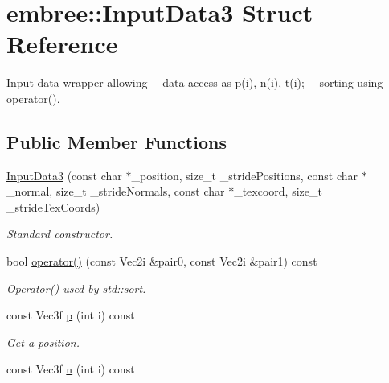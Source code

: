 \hypertarget{structembree_1_1_input_data3}{
\section{embree::InputData3 Struct Reference}
\label{structembree_1_1_input_data3}
}


Input data wrapper allowing -\/-\/ data access as p(i), n(i), t(i); -\/-\/ sorting using operator().  


\subsection*{Public Member Functions}
\begin{DoxyCompactItemize}
\item 
\hypertarget{structembree_1_1_input_data3_a89c0df89ad67e3b77adde63059ed0fe5}{
\hyperlink{structembree_1_1_input_data3_a89c0df89ad67e3b77adde63059ed0fe5}{InputData3} (const char $\ast$\_\-position, size\_\-t \_\-stridePositions, const char $\ast$\_\-normal, size\_\-t \_\-strideNormals, const char $\ast$\_\-texcoord, size\_\-t \_\-strideTexCoords)}
\label{structembree_1_1_input_data3_a89c0df89ad67e3b77adde63059ed0fe5}

\begin{DoxyCompactList}\small\item\em Standard constructor. \item\end{DoxyCompactList}\item 
\hypertarget{structembree_1_1_input_data3_a0934a2fa70cacba4d32a91ce032ad1be}{
bool \hyperlink{structembree_1_1_input_data3_a0934a2fa70cacba4d32a91ce032ad1be}{operator()} (const Vec2i \&pair0, const Vec2i \&pair1) const }
\label{structembree_1_1_input_data3_a0934a2fa70cacba4d32a91ce032ad1be}

\begin{DoxyCompactList}\small\item\em Operator() used by std::sort. \item\end{DoxyCompactList}\item 
\hypertarget{structembree_1_1_input_data3_a0bf7d066158f4ea7e521b8dbd855a080}{
const Vec3f \hyperlink{structembree_1_1_input_data3_a0bf7d066158f4ea7e521b8dbd855a080}{p} (int i) const }
\label{structembree_1_1_input_data3_a0bf7d066158f4ea7e521b8dbd855a080}

\begin{DoxyCompactList}\small\item\em Get a position. \item\end{DoxyCompactList}\item 
\hypertarget{structembree_1_1_input_data3_ad98fd1a06577cfa22e4a4c11b227aa37}{
const Vec3f \hyperlink{structembree_1_1_input_data3_ad98fd1a06577cfa22e4a4c11b227aa37}{n} (int i) const }
\label{structembree_1_1_input_data3_ad98fd1a06577cfa22e4a4c11b227aa37}


\end{DoxyCompactItemize}
